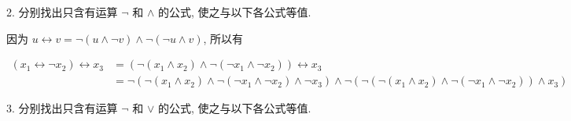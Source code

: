 \documentclass[boxes]{homework}
\begin{document}
\setlength\abovedisplayskip{.125em}
\setlength\belowdisplayskip{.125em}
\begin{problem}
2. 分别找出只含有运算 $\lnot$ 和 $\land$ 的公式, 使之与以下各公式等值.
\end{problem}

\begin{solution}
因为 $u\leftrightarrow v = \lnot (u\land \lnot v)\land\lnot (\lnot u\land v)$, 所以有

\begin{equation*}
    \begin{aligned}
        (x_1\leftrightarrow \lnot x_2)\leftrightarrow x_3 &= (\lnot (x_1\land x_2)\land\lnot (\lnot x_1\land\lnot x_2))\leftrightarrow x_3\\
        &=  \lnot(\lnot (x_1\land x_2)\land\lnot (\lnot x_1\land\lnot x_2)\land\lnot x_3)\land\lnot (\lnot(\lnot(x_1\land x_2)\land\lnot(\lnot x_1\land\lnot x_2))\land x_3)
    \end{aligned}
\end{equation*}
\end{solution}
\begin{problem}
    3. 分别找出只含有运算 $\lnot$ 和 $\lor$ 的公式, 使之与以下各公式等值.
\end{problem}
\end{document}
